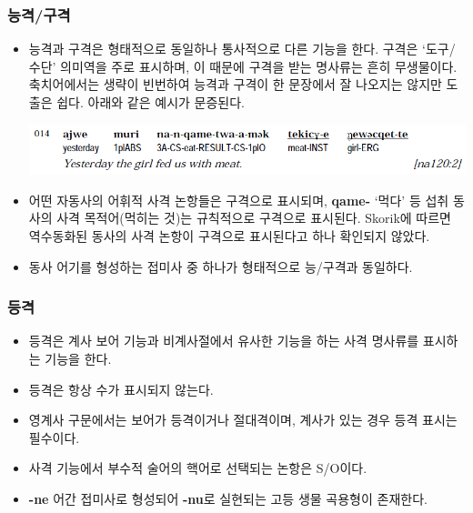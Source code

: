 \subsubsection{능격/구격}
\begin{itemize}
	\item 능격과 구격은 형태적으로 동일하나 통사적으로 다른 기능을 한다. 구격은 `도구/수단' 의미역을 주로 표시하며, 이 때문에 구격을 받는 명사류는 흔히 무생물이다. 축치어에서는 생략이 빈번하여 능격과 구격이 한 문장에서 잘 나오지는 않지만 도출은 쉽다. 아래와 같은 예시가 문증된다.
\begin{center}
\includegraphics[width=\linewidth]{Chukchi/src/chei.png}
\end{center}
	\item 어떤 자동사의 어휘적 사격 논항들은 구격으로 표시되며, \textbf{qame-} `먹다' 등 섭취 동사의 사격 목적어(먹히는 것)는 규칙적으로 구격으로 표시된다. Skorik에 따르면 역수동화된 동사의 사격 논항이 구격으로 표시된다고 하나 확인되지 않았다.
	\item 동사 어기를 형성하는 접미사 중 하나가 형태적으로 능/구격과 동일하다.
\end{itemize}
\subsubsection{등격}
\begin{itemize}
	\item 등격은 계사 보어 기능과 비계사절에서 유사한 기능을 하는 사격 명사류를 표시하는 기능을 한다.
	\item 등격은 항상 수가 표시되지 않는다.
	\item 영계사 구문에서는 보어가 등격이거나 절대격이며, 계사가 있는 경우 등격 표시는 필수이다.
	\item 사격 기능에서 부수적 술어의 핵어로 선택되는 논항은 S/O이다.
	\item \textbf{-ne} 어간 접미사로 형성되어 \textbf{-nu}로 실현되는 고등 생물 곡용형이 존재한다.
\end{itemize}

